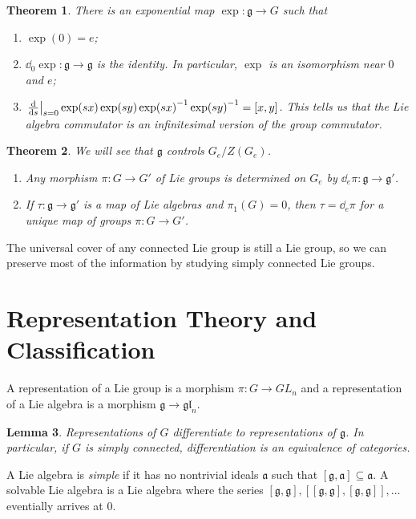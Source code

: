 \documentclass[leqno, openany]{memoir}
\newtheorem{thm}{Theorem}[chapter]
\newtheorem{lem}[thm]{Lemma}
\theoremstyle{definition}
\theoremstyle{remark}
\theoremstyle{plain}
\theoremstyle{definition}
\theoremstyle{remark}
\newcommand{\mf}[1]{\mathfrak{#1}}
\begin{document}
\begin{thm} There is an exponential map $\exp: \mf{g} \to G$ such that
    \begin{enumerate} \item $\exp(0) = e$; \item $\dd_0 \exp: \mf{g} \to
        \mf{g}$ is the identity. In particular, $\exp$ is an isomorphism near
        $0$ and $e$; \item $\eval{\dv{s}}_{s=0} \exp(sx) \exp(sy) \exp(sx)^{-1}
        \exp(sy)^{-1} = [x,y]$. This tells us that the Lie algebra commutator
        is an infinitesimal version of the group commutator.  \end{enumerate}
    \end{thm}

\begin{thm} We will see that $\mf{g}$ controls $G_e / Z(G_e)$.
    \begin{enumerate} \item Any morphism $\pi: G \to G'$ of Lie groups is
        determined on $G_e$ by $\dd_e \pi: \mf{g} \to \mf{g}'$.  \item If
        $\tau: \mf{g} \to \mf{g}'$ is a map of Lie algebras and $\pi_1(G) = 0$,
        then $\tau = \dd_e \pi$ for a unique map of groups $\pi: G \to G'$.
\end{enumerate} \end{thm}

The universal cover of any connected Lie group is still a Lie group, so we can
preserve most of the information by studying simply connected Lie groups.

\section{Representation Theory and Classification}%
\label{sec:representation_theory_and_classification}

A representation of a Lie group is a morphism $\pi: G \to GL_n$ and a
representation of a Lie algebra is a morphism $\mf{g} \to \mf{gl}_n$.

\begin{lem} Representations of $G$ differentiate to representations of
$\mf{g}$. In particular, if $G$ is simply connected, differentiation is an
equivalence of categories.  \end{lem}

A Lie algebra is \textit{simple} if it has no nontrivial ideals $\mf{a}$ such
that $[\mf{g}, \mf{a}] \subseteq \mf{a}$. A solvable Lie algebra is a Lie
algebra where the series $[\mf{g}, \mf{g}], [[\mf{g}, \mf{g}], [\mf{g},
\mf{g}]], \ldots$ eventially arrives at $0$.
\end{document}
